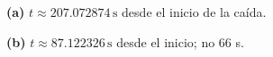 \noindent\textbf{(a)} $t\approx207.072874\,\mathrm s$ desde el inicio de la caída.

\noindent\textbf{(b)} $t\approx87.122326\,\mathrm s$ desde el inicio; no $66$ s.
